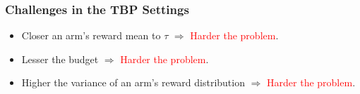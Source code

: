 \begin{frame}
\frametitle{Challenges in the TBP Settings}

\begin{itemize}
\item<1-> Closer an arm's reward mean to $\tau$ $\Rightarrow$ \textcolor{red}{Harder the problem}.
\vspace*{6mm}
\item<2-> Lesser the budget $\Rightarrow$ \textcolor{red}{Harder the problem}.
\vspace*{6mm}
\item<3-> Higher the variance of an arm's reward distribution $\Rightarrow$ \textcolor{red}{Harder the problem}.


\end{itemize}

\end{frame}



